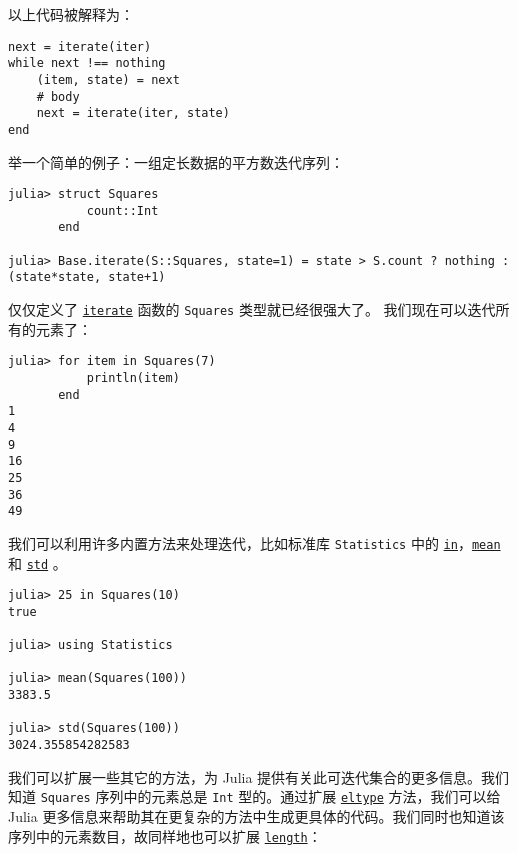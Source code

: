 以上代码被解释为：




\begin{verbatim}
next = iterate(iter)
while next !== nothing
    (item, state) = next
    # body
    next = iterate(iter, state)
end
\end{verbatim}



举一个简单的例子：一组定长数据的平方数迭代序列：




\begin{verbatim}
julia> struct Squares
           count::Int
       end

julia> Base.iterate(S::Squares, state=1) = state > S.count ? nothing : (state*state, state+1)
\end{verbatim}



仅仅定义了 \hyperlink{1722534687975587846}{\texttt{iterate}} 函数的 \texttt{Squares} 类型就已经很强大了。 我们现在可以迭代所有的元素了：




\begin{verbatim}
julia> for item in Squares(7)
           println(item)
       end
1
4
9
16
25
36
49
\end{verbatim}



我们可以利用许多内置方法来处理迭代，比如标准库 \texttt{Statistics}  中的 \hyperlink{17277603976666670638}{\texttt{in}}，\hyperlink{15061550543970113934}{\texttt{mean}} 和 \hyperlink{1955374586742019663}{\texttt{std}} 。




\begin{verbatim}
julia> 25 in Squares(10)
true

julia> using Statistics

julia> mean(Squares(100))
3383.5

julia> std(Squares(100))
3024.355854282583
\end{verbatim}



我们可以扩展一些其它的方法，为 Julia 提供有关此可迭代集合的更多信息。我们知道 \texttt{Squares} 序列中的元素总是 \texttt{Int} 型的。通过扩展 \hyperlink{6396209842929672718}{\texttt{eltype}} 方法，我们可以给 Julia 更多信息来帮助其在更复杂的方法中生成更具体的代码。我们同时也知道该序列中的元素数目，故同样地也可以扩展 \hyperlink{9362803119463040896}{\texttt{length}}：




